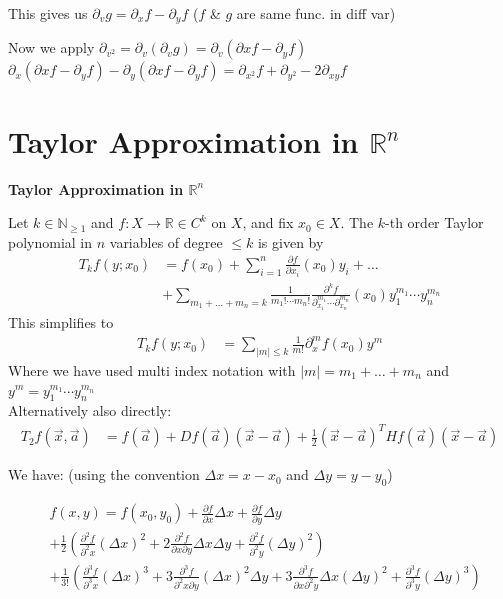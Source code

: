 \documentclass[25pt]{sciposter}
\newcommand{\R}{\mathbb{R}}
\newcommand{\N}{\mathbb{N}}
\newenvironment{method}[1]{\begin{mdframed}[backgroundcolor=blue!10,innertopmargin=15pt, innerbottommargin=15pt, nobreak=true]
		\textbf{#1 }
	}
	{ 
	\end{mdframed}
}
\begin{document}
\begin{multicols}{3}
This gives us $\partial_v g = \partial_x f - \partial _y f$ ($f$ \& $g$ are same func. in diff var)

Now we apply $\partial_{v^2} = \partial _v (\partial_v g) =   \partial _v(\partial x f - \partial _y f)$
$\partial_x (\partial x f - \partial _y f) - \partial _y (\partial x f - \partial _y f) = \partial _{x^2} f + \partial_{y^2} -2\partial_{xy}f$



\section*{Taylor Approximation in $\R^n$}


\begin{method}{Taylor Approximation in $\R^n$}
	Let $k\in \N_{\geq 1}$ and $f:X \to \R  \in C^k$ on $X$, and fix $x_0 \in X$. The $k$-th order Taylor polynomial in $n$ variables of degree $\leq k$ is given by
	\begin{align*}
		T_k f(y;x_0) &= f(x_0) + \sum_{i=1}^{n} \frac{\partial f}{\partial x_i} (x_0) y_i + \ldots \\ & + \sum_{m_1 + \ldots + m_n = k}  \frac{1}{m_1 ! \cdots m_n !} \frac{\partial ^k f}{\partial_{x_1}^{m_1} \cdots \partial_{x_n}^{m_n} } (x_0) y_{1}^{m_1} \cdots y_{n}^{m_n}
	\end{align*}
	This simplifies to
	\begin{align*}
		T_{k} f(y;x_0) &= \sum_{|m|\leq k} \frac{1}{m!} \partial^{m}_{x} f(x_0) y^m
	\end{align*}
	Where we have used multi index notation with $|m| = m_1 + \ldots + m_n$ and $y^m = y_{1}^{m_1} \cdots y_{n}^{m_n}$\\
	
	Alternatively also directly:
	\begin{align*}
		  T_2f(\vec{x},\vec{a}) &= f(\vec{a}) + Df(\vec{a}) (\vec{x}-\vec{a}) +  \frac{1}{2} (\vec{x}-\vec{a})^T Hf(\vec{a}) (\vec{x}-\vec{a})
	\end{align*}
	
\end{method}


We have: (using the convention $\Delta x = x-x_0$ and $\Delta y = y-y_0$)

\begin{align*}
	&f(x,y) = f(x_0,y_0) + \frac{\partial f}{\partial x} \Delta x + \frac{\partial f}{\partial y} \Delta y\\
	&+ \frac{1}{2}\left(  \frac{\partial^2 f}{\partial^2 x} (\Delta x)^2  +  2\frac{\partial^2 f}{\partial x \partial y} \Delta x \Delta y +     \frac{\partial^2 f}{\partial^2 y} (\Delta y)^2   \right)\\
	&+ \frac{1}{3!}\left(    \frac{\partial^3 f}{\partial^3 x} (\Delta x)^3    + 3\frac{\partial^3 f}{\partial^2 x \partial y } (\Delta x)^2 \Delta y  +3\frac{\partial^3 f}{\partial x \partial^2 y } \Delta x (\Delta y)^2 +  \frac{\partial^3 f}{\partial^3 y} (\Delta y)^3 \right) 
\end{align*}




\end{multicols}
\end{document}
